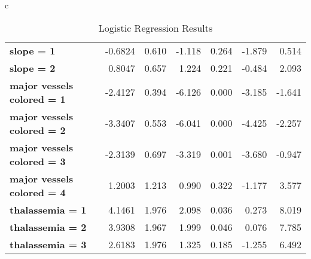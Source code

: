 \begin{table*}[!tp]
{{\begin{tabular}{c}
\begin{tabular*}{\textwidth}{l  @{\extracolsep{\fill}} rrrrrr}
        \textbf{slope = 1}                         &      -0.6824  &        0.610     &    -1.118  &         0.264        &       -1.879    &        0.514     \\
        \textbf{slope = 2}                         &       0.8047  &        0.657     &     1.224  &         0.221        &       -0.484    &        2.093     \\
        \textbf{major vessels colored = 1}         &      -2.4127  &        0.394     &    -6.126  &         0.000        &       -3.185    &       -1.641     \\
        \textbf{major vessels colored = 2}         &      -3.3407  &        0.553     &    -6.041  &         0.000        &       -4.425    &       -2.257     \\
        \textbf{major vessels colored = 3}         &      -2.3139  &        0.697     &    -3.319  &         0.001        &       -3.680    &       -0.947     \\
        \textbf{major vessels colored = 4}         &       1.2003  &        1.213     &     0.990  &         0.322        &       -1.177    &        3.577     \\
        \textbf{thalassemia = 1}                   &       4.1461  &        1.976     &     2.098  &         0.036        &        0.273    &        8.019     \\
        \textbf{thalassemia = 2}                   &       3.9308  &        1.967     &     1.999  &         0.046        &        0.076    &        7.785     \\
        \textbf{thalassemia = 3}                   &       2.6183  &        1.976     &     1.325  &         0.185        &       -1.255    &        6.492     \\

        \end{tabular*}  \\
        \bottomrule
        \end{tabular}
    }
}

\caption{Logistic Regression Results}\label{tab:logit-regression}
\end{table*}